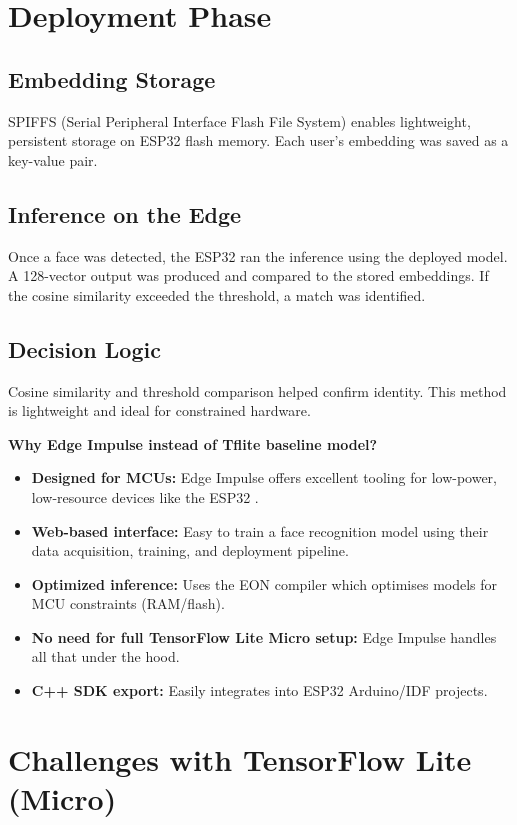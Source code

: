 \section{Deployment Phase}
\subsection{Embedding Storage}
SPIFFS (Serial Peripheral Interface Flash File System) enables lightweight, persistent storage on ESP32 flash memory. Each user's embedding was saved as a key-value pair.

\subsection{Inference on the Edge}
Once a face was detected, the ESP32 ran the inference using the deployed model. A 128-vector output was produced and compared to the stored embeddings. If the cosine similarity exceeded the threshold, a match was identified.

\subsection{Decision Logic}
Cosine similarity and threshold comparison helped confirm identity. This method is lightweight and ideal for constrained hardware.

\textbf{Why Edge Impulse instead of Tflite baseline model?}
\begin{itemize}
    \item \textbf{Designed for MCUs:} Edge Impulse offers excellent tooling for low-power, low-resource devices like the ESP32 \cite{EI:2023}.
    \item \textbf{Web-based interface:} Easy to train a face recognition model using their data acquisition, training, and deployment pipeline.
    \item \textbf{Optimized inference:} Uses the EON compiler which optimises models for MCU constraints (RAM/flash).
    \item \textbf{No need for full TensorFlow Lite Micro setup:} Edge Impulse handles all that under the hood.
    \item \textbf{C++ SDK export:} Easily integrates into ESP32 Arduino/IDF projects.
\end{itemize}

\section{Challenges with TensorFlow Lite (Micro)}

